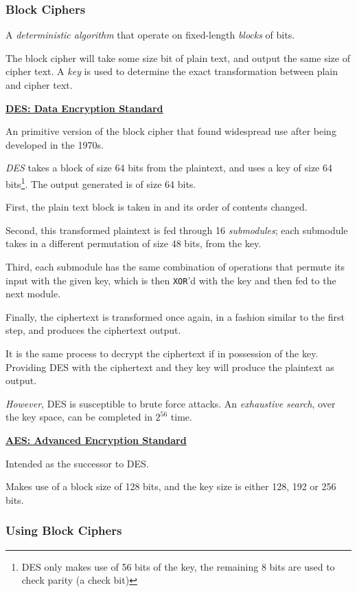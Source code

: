\documentclass{article}
\begin{document}
\subsubsection{Block Ciphers}

A \textit{deterministic algorithm} that operate on fixed-length \textit{blocks} of bits.

The block cipher will take some size bit of plain text, and output the same size of cipher text. A \textit{key} is used to determine the exact transformation between plain and cipher text.

\textbf{\underline{DES: Data Encryption Standard}}

An primitive version of the block cipher that found widespread use after being developed in the 1970s.

\textit{DES} takes a block of size 64 bits from the plaintext, and uses a key of size 64 bits\footnote{DES only makes use of 56 bits of the key, the remaining 8 bits are used to check parity (a check bit)}. The output generated is of size 64 bits.

First, the plain text block is taken in and its order of contents changed.

Second, this transformed plaintext is fed through 16 \textit{submodules}; each submodule takes in a different permutation of size 48 bits, from the key.

Third, each submodule has the same combination of operations that permute its input with the given key, which is then \texttt{XOR}'d with the key and then fed to the next module.

Finally, the ciphertext is transformed once again, in a fashion similar to the first step, and produces the ciphertext output.

It is the same process to decrypt the ciphertext if in possession of the key. Providing DES with the ciphertext and they key will produce the plaintext as output.

\textit{However}, DES is susceptible to brute force attacks. An \textit{exhaustive search}, over the key space, can be completed in $2^{56}$ time.

\textbf{\underline{AES: Advanced Encryption Standard}}

Intended as the successor to DES.

Makes use of a block size of 128 bits, and the key size is either 128, 192 or 256 bits.

\subsubsection{Using Block Ciphers}
\end{document}
